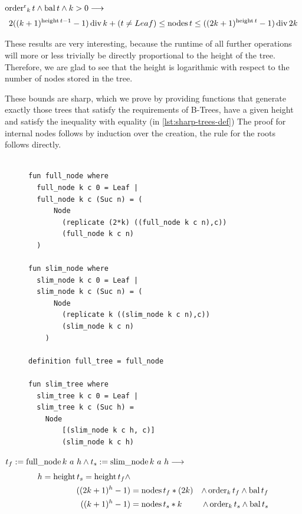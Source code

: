 \begin{theorem}
    $\operatorname{order^r}_k t \wedge \operatorname{bal} t \wedge k > 0 \longrightarrow$
    \begin{equation}
        2((k+1)^{\operatorname{height} t - 1} - 1) \operatorname{div} k + (t \neq Leaf) \le \operatorname{nodes} t \le ((2k+1)^{\operatorname{height} t} - 1) \operatorname{div} 2k
    \end{equation}
\end{theorem}

These results are very interesting, because
the runtime of all further operations will more or less trivially be
directly proportional to the height of the tree.
Therefore, we are glad to see that the height is logarithmic
with respect to the number of nodes stored in the tree.

These bounds are sharp, which we prove by providing 
functions that generate exactly those trees
that satisfy the requirements of B-Trees, have a given height
and satisfy the inequality with equality (in \autoref{lst:sharp-trees-def})
The proof for internal nodes follows by induction over the creation,
the rule for the roots follows directly.

\begin{figure}
\begin{lstlisting}[mathescape=true, language=Isabelle,label={lst:sharp-trees-def},
    caption={The functions generating trees with minimal size and maximal size for given height.}]

fun full_node where
  full_node k c 0 = Leaf |
  full_node k c (Suc n) = (
      Node
        (replicate (2*k) ((full_node k c n),c))
        (full_node k c n)
  )

fun slim_node where
  slim_node k c 0 = Leaf |
  slim_node k c (Suc n) = (
      Node
        (replicate k ((slim_node k c n),c))
        (slim_node k c n)
    )

definition full_tree = full_node

fun slim_tree where
  slim_tree k c 0 = Leaf |
  slim_tree k c (Suc h) =
    Node
        [(slim_node k c h, c)]
        (slim_node k c h)

\end{lstlisting}
\end{figure}


\begin{lemma} $t_f := \operatorname{full\_node} k\ a\ h \wedge t_s := \operatorname{slim\_node} k\ a\ h \longrightarrow$
    \begin{align}
    h = \operatorname{height} t_s = \operatorname{height} t_f \wedge \\
    ((2k+1)^h - 1) &= \operatorname{nodes} t_f * (2k) &\wedge \operatorname{order}_k t_f \wedge \operatorname{bal} t_f \\ 
    ((k+1)^h - 1) &= \operatorname{nodes} t_s * k  &\wedge \operatorname{order}_k t_s \wedge \operatorname{bal} t_s
    \end{align}
\end{lemma}

